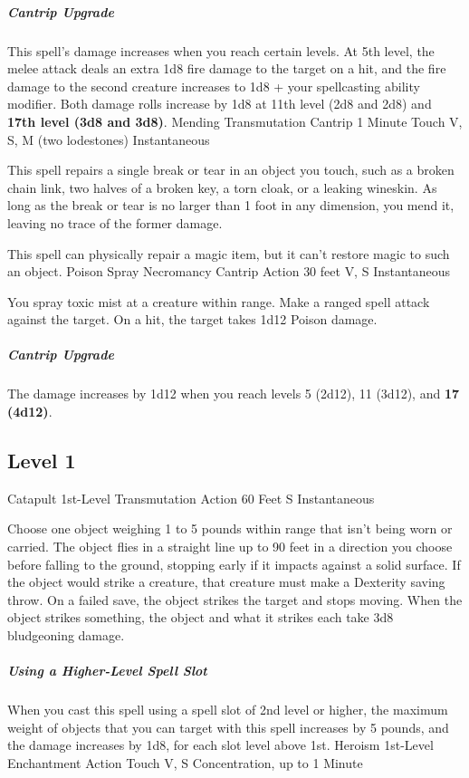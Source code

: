 \documentclass[letterpaper,openany,oneside,twocolumn]{book}
\begin{document}
\subparagraph*{Cantrip Upgrade} This spell's damage increases when you reach certain levels. At 5th level, the melee attack deals an extra 1d8 fire damage to the target on a hit, and the fire damage to the second creature increases to 1d8 + your spellcasting ability modifier. Both damage rolls increase by 1d8 at 11th level (2d8 and 2d8) and \textbf{17th level (3d8 and 3d8)}.
\DndSpellHeader
  {Mending}
  {Transmutation Cantrip}
  {1 Minute}
  {Touch}
  {V, S, M (two lodestones)}
  {Instantaneous}

This spell repairs a single break or tear in an object you touch, such as a broken chain link, two halves of a broken key, a torn cloak, or a leaking wineskin. As long as the break or tear is no larger than 1 foot in any dimension, you mend it, leaving no trace of the former damage.

This spell can physically repair a magic item, but it can't restore magic to such an object.
\DndSpellHeader
  {Poison Spray}
  {Necromancy Cantrip}
  {Action}
  {30 feet}
  {V, S}
  {Instantaneous}

You spray toxic mist at a creature within range. Make a ranged spell attack against the target. On a hit, the target takes 1d12 Poison damage.

\subparagraph*{Cantrip Upgrade} The damage increases by 1d12 when you reach levels 5 (2d12), 11 (3d12), and \textbf{17 (4d12)}.

\subsection*{Level 1}
\DndSpellHeader
  {Catapult}
  {1st-Level Transmutation}
  {Action}
  {60 Feet}
  {S}
  {Instantaneous}

Choose one object weighing 1 to 5 pounds within range that isn't being worn or carried. The object flies in a straight line up to 90 feet in a direction you choose before falling to the ground, stopping early if it impacts against a solid surface. If the object would strike a creature, that creature must make a Dexterity saving throw. On a failed save, the object strikes the target and stops moving. When the object strikes something, the object and what it strikes each take 3d8 bludgeoning damage.

\subparagraph*{Using a Higher-Level Spell Slot} When you cast this spell using a spell slot of 2nd level or higher, the maximum weight of objects that you can target with this spell increases by 5 pounds, and the damage increases by 1d8, for each slot level above 1st.
\DndSpellHeader
  {Heroism}
  {1st-Level Enchantment}
  {Action}
  {Touch}
  {V, S}
  {Concentration, up to 1 Minute}
\end{document}

